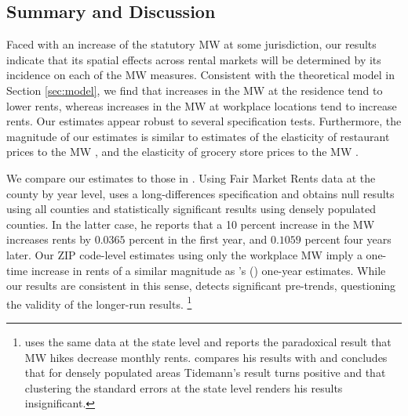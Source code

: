 \subsection{Summary and Discussion}
\label{sec:results_discussion}

Faced with an increase of the statutory MW at some jurisdiction, our results
indicate that its spatial effects across rental markets will be determined by 
its incidence on each of the MW measures.
Consistent with the theoretical model in Section \ref{sec:model}, we find that 
increases in the MW at the residence tend to lower rents, whereas increases 
in the MW at workplace locations tend to increase rents.
Our estimates appear robust to several specification tests.
Furthermore, the magnitude of our estimates is similar to estimates of the
elasticity of restaurant prices to the MW \parencite{AllegrettoReich2018},
and the elasticity of grocery store prices to the MW 
\parencite{RenkinEtAl2020, Leung2021}.

We compare our estimates to those in \textcite{Yamagishi2019, AgarwalEtAl2021}.
Using Fair Market Rents data at the county by year level, 
\textcite[][, Tables 1 and 2]{Yamagishi2019} uses a long-differences 
specification and obtains null results using all counties and statistically 
significant results using densely populated counties.
In the latter case, he reports that a 10 percent increase in the MW increases
rents by $0.0365$ percent in the first year, and $0.1059$ percent four years 
later.
Our ZIP code-level estimates using only the workplace MW imply a one-time 
increase in rents of a similar magnitude as \citeauthor{Yamagishi2019}'s 
(\citeyear[][Table 2, Column 1]{Yamagishi2019}) one-year estimates.
While our results are consistent in this sense, 
\textcite[][Table 3]{Yamagishi2019} detects significant pre-trends,
questioning the validity of the longer-run results.%
\footnote{\textcite{Tidemann2018} uses the same data at the state level and 
reports the paradoxical result that MW hikes decrease monthly rents.
\textcite[][, Appendix C.1.3.]{Yamagishi2019} compares his results with 
\textcite{Tidemann2018} and concludes that for densely populated areas 
Tidemann's result turns positive and that clustering the standard errors at the
state level renders his results insignificant.}

